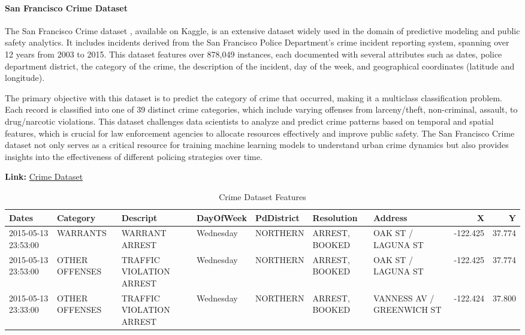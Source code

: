 \documentclass{article}
\theoremstyle{plain}
\theoremstyle{definition}
\theoremstyle{remark}
\begin{document}
\newpage

\paragraph{San Francisco Crime Dataset} The San Francisco Crime dataset \cite{sf-crime}, available on Kaggle, is an extensive dataset widely used in the domain of predictive modeling and public safety analytics. It includes incidents derived from the San Francisco Police Department's crime incident reporting system, spanning over 12 years from 2003 to 2015. This dataset features over 878,049 instances, each documented with several attributes such as dates, police department district, the category of the crime, the description of the incident, day of the week, and geographical coordinates (latitude and longitude).

The primary objective with this dataset is to predict the category of crime that occurred, making it a multiclass classification problem. Each record is classified into one of 39 distinct crime categories, which include varying offenses from larceny/theft, non-criminal, assault, to drug/narcotic violations. This dataset challenges data scientists to analyze and predict crime patterns based on temporal and spatial features, which is crucial for law enforcement agencies to allocate resources effectively and improve public safety. The San Francisco Crime dataset not only serves as a critical resource for training machine learning models to understand urban crime dynamics but also provides insights into the effectiveness of different policing strategies over time.

\textbf{Link: }\href{https://www.kaggle.com/c/sf-crime}{Crime Dataset}

\begin{table}[h!]
\centering
\caption{Crime Dataset Features}
\begin{adjustbox}{width=1\textwidth} %
\begin{tabular}{lllllllrr}
\toprule
              Dates &       Category &                 Descript & DayOfWeek & PdDistrict &     Resolution &                   Address &      X &    Y \\
\midrule
2015-05-13 23:53:00 &       WARRANTS &           WARRANT ARREST & Wednesday &   NORTHERN & ARREST, BOOKED &        OAK ST / LAGUNA ST & -122.425 & 37.774 \\
2015-05-13 23:53:00 & OTHER OFFENSES & TRAFFIC VIOLATION ARREST & Wednesday &   NORTHERN & ARREST, BOOKED &        OAK ST / LAGUNA ST & -122.425 & 37.774 \\
2015-05-13 23:33:00 & OTHER OFFENSES & TRAFFIC VIOLATION ARREST & Wednesday &   NORTHERN & ARREST, BOOKED & VANNESS AV / GREENWICH ST & -122.424 & 37.800 \\
\bottomrule
\end{tabular}
\end{adjustbox}
\end{table}
\end{document}
